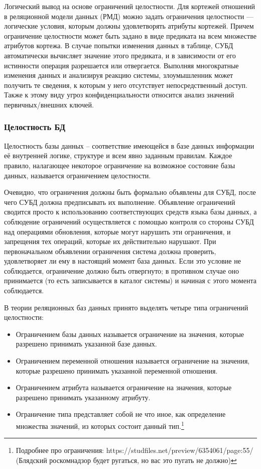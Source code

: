 Логический вывод на основе ограничений целостности. Для кортежей отношений в реляционной модели данных (РМД) можно задать ограничения целостности — логические условия, которым должны удовлетворять атрибуты кортежей. Причем ограничение целостности может быть задано в виде предиката на всем множестве атрибутов кортежа. В случае попытки изменения данных в таблице, СУБД автоматически вычисляет значение этого предиката, и в зависимости от его истинности операция разрешается или отвергается. Выполняя многократные изменения данных и анализируя реакцию системы, злоумышленник может получить те сведения, к которым у него отсутствует непосредственный доступ. Также к этому виду угроз конфиденциальности относится анализ значений первичных/внешних ключей.

\subsubsection{Целостность БД}
Целостность базы данных -- соответствие имеющейся в базе данных информации её внутренней логике, структуре и всем явно заданным правилам. Каждое правило, налагающее некоторое ограничение на возможное состояние базы данных, называется ограничением целостности.

Очевидно, что ограничения должны быть формально объявлены для СУБД, после чего СУБД должна предписывать их выполнение. Объявление ограничений сводится просто к использованию соответствующих средств языка базы данных, а соблюдение ограничений осуществляется с помощью контроля со стороны СУБД над операциями обновления, которые могут нарушить эти ограничения, и запрещения тех операций, которые их действительно нарушают. При первоначальном объявлении ограничения система должна проверить, удовлетворяет ли ему в настоящий момент база данных. Если это условие не соблюдается, ограничение должно быть отвергнуто; в противном случае оно принимается (то есть записывается в каталог системы) и начиная с этого момента соблюдается.

В теории реляционных баз данных принято выделять четыре типа ограничений целостности:
\begin{itemize}
	\item Ограничением базы данных называется ограничение на значения, которые разрешено принимать указанной базе данных.
	\item Ограничением переменной отношения называется ограничение на значения, которые разрешено принимать указанной переменной отношения.
	\item Ограничением атрибута называется ограничение на значения, которые разрешено принимать указанному атрибуту.
	\item Ограничение типа представляет собой не что иное, как определение множества значений, из которых состоит данный тип.\footnote{Подробнее про ограничения: https://studfiles.net/preview/6354061/page:55/ (Блядский роскомнадзор будет ругаться, но вас это пугать не должно)}
\end{itemize}

